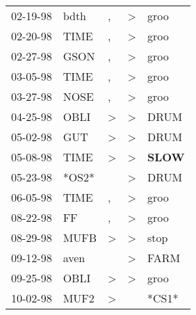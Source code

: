 \begin{supertabular}{p{0.07\textwidth}p{0.06\textwidth}p{0.02\textwidth}p{0.02\textwidth}p{0.06\textwidth}}
 02-19-98\textsuperscript{} &  bdth\textsuperscript{} &             , &  \textgreater &           groo\textsuperscript{} \\
 02-20-98\textsuperscript{} &  TIME\textsuperscript{} &             , &  \textgreater &           groo\textsuperscript{} \\
 02-27-98\textsuperscript{} &  GSON\textsuperscript{} &             , &  \textgreater &           groo\textsuperscript{} \\
 03-05-98\textsuperscript{} &  TIME\textsuperscript{} &             , &  \textgreater &           groo\textsuperscript{} \\
 03-27-98\textsuperscript{} &  NOSE\textsuperscript{} &             , &  \textgreater &           groo\textsuperscript{} \\
 04-25-98\textsuperscript{} &  OBLI\textsuperscript{} &  \textgreater &  \textgreater &           DRUM\textsuperscript{} \\
 05-02-98\textsuperscript{} &   GUT\textsuperscript{} &  \textgreater &  \textgreater &           DRUM\textsuperscript{} \\
 05-08-98\textsuperscript{} &  TIME\textsuperscript{} &  \textgreater &  \textgreater &  \textbf{SLOW\textsuperscript{}} \\
 05-23-98\textsuperscript{} &                   *OS2* &               &  \textgreater &           DRUM\textsuperscript{} \\
 06-05-98\textsuperscript{} &  TIME\textsuperscript{} &             , &  \textgreater &           groo\textsuperscript{} \\
 08-22-98\textsuperscript{} &    FF\textsuperscript{} &             , &  \textgreater &           groo\textsuperscript{} \\
 08-29-98\textsuperscript{} &  MUFB\textsuperscript{} &  \textgreater &  \textgreater &           stop\textsuperscript{} \\
 09-12-98\textsuperscript{} &  aven\textsuperscript{} &               &  \textgreater &           FARM\textsuperscript{} \\
 09-25-98\textsuperscript{} &  OBLI\textsuperscript{} &  \textgreater &  \textgreater &           groo\textsuperscript{} \\
 10-02-98\textsuperscript{} &  MUF2\textsuperscript{} &  \textgreater &               &                            *CS1* \\

\end{supertabular}
